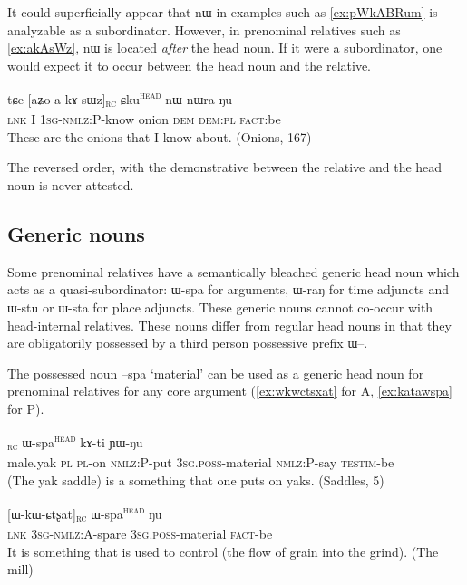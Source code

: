 \documentclass[oldfontcommands,oneside,a4paper,11pt]{article}
\newcommand{\ipa}[1]{{\phon #1}} %
\newcommand{\topic}{\textsc{dem}}
\newcommand{\tete}{\textsuperscript{\textsc{head}}}
\newcommand{\rc}{\textsubscript{\textsc{rc}}}
\begin{document}
It could superficially appear that \ipa{nɯ} in examples such as  \ref{ex:pWkABRum} is analyzable as a subordinator. However, in prenominal relatives such as \ref{ex:akAsWz}, \ipa{nɯ} is located \textit{after} the head noun. If it were a subordinator, one would expect it to occur between the head noun and the relative.

\begin{exe}
   \ex \label{ex:akAsWz}
 \gll
\ipa{tɕe}  	[\ipa{aʑo}  	\ipa{a-kɤ-sɯz}]\rc{}  	\ipa{ɕku}\tete{}  	\ipa{nɯ}  	\ipa{nɯra}  	\ipa{ŋu}  \\
\textsc{lnk} I \textsc{1sg-nmlz:P}-know onion \topic{} \textsc{dem:pl} \textsc{fact}:be \\
\glt These are the onions that I know about.  (Onions, 167)
\end{exe}

The reversed order, with the demonstrative between the relative and the head noun is never attested.

\subsection{Generic nouns} \label{sec:generic.noun}
Some prenominal relatives have a semantically bleached generic head noun which acts as a quasi-subordinator: \ipa{ɯ-spa} for arguments, \ipa{ɯ-raŋ} for time adjuncts and \ipa{ɯ-stu} or \ipa{ɯ-sta} for place adjuncts. These generic nouns cannot co-occur with head-internal relatives. These nouns differ from regular head nouns in that they are obligatorily possessed by a third person possessive prefix \ipa{ɯ}--.


The possessed noun \ipa{--spa} `material' can be used as a generic head noun for prenominal relatives for any core argument (\ref{ex:wkwctsxat} for A, \ref{ex:katawspa} for P).

     \begin{exe}
   \ex \label{ex:katawspa}
 \gll  [\ipa{qambrɯ}   	\ipa{ra}   	\ipa{nɯ-taʁ}   	\ipa{kɤ-ta}]\rc{}   	\ipa{ɯ-spa}\tete{}   	\ipa{kɤ-ti}   	\ipa{ɲɯ-ŋu}   \\
male.yak \textsc{pl} \textsc{pl}-on \textsc{nmlz:P}-put \textsc{3sg.poss}-material \textsc{nmlz:P}-say \textsc{testim}-be \\
\glt (The yak saddle) is a something that one puts on  yaks. (Saddles, 5)
\end{exe}


     \begin{exe}
   \ex \label{ex:wkwctsxat}
 \gll \ipa{tɕe}   	[\ipa{ɯ-kɯ-ɕtʂat}]\rc{}   	\ipa{ɯ-spa}\tete{}   	\ipa{ŋu}        \\
\textsc{lnk} \textsc{3sg-nmlz:A}-spare  \textsc{3sg.poss}-material \textsc{fact}-be\\
\glt  It is something that is used to control (the flow of grain into the grind). (The mill)
\end{exe}
\end{document}
